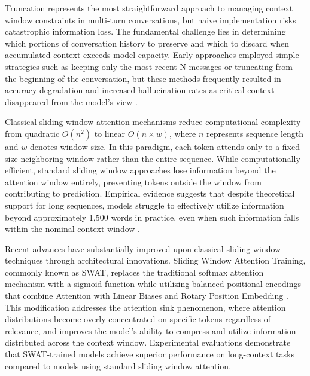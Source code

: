 Truncation represents the most straightforward approach to managing context window constraints in multi-turn conversations, but naive implementation risks catastrophic information loss. The fundamental challenge lies in determining which portions of conversation history to preserve and which to discard when accumulated context exceeds model capacity. Early approaches employed simple strategies such as keeping only the most recent N messages or truncating from the beginning of the conversation, but these methods frequently resulted in accuracy degradation and increased hallucination rates as critical context disappeared from the model's view \citep{greyling2024context}.

Classical sliding window attention mechanisms reduce computational complexity from quadratic $O(n^2)$ to linear $O(n \times w)$, where $n$ represents sequence length and $w$ denotes window size. In this paradigm, each token attends only to a fixed-size neighboring window rather than the entire sequence. While computationally efficient, standard sliding window approaches lose information beyond the attention window entirely, preventing tokens outside the window from contributing to prediction. Empirical evidence suggests that despite theoretical support for long sequences, models struggle to effectively utilize information beyond approximately 1,500 words in practice, even when such information falls within the nominal context window \citep{press2022train}.

Recent advances have substantially improved upon classical sliding window techniques through architectural innovations. Sliding Window Attention Training, commonly known as SWAT, replaces the traditional softmax attention mechanism with a sigmoid function while utilizing balanced positional encodings that combine Attention with Linear Biases and Rotary Position Embedding \citep{chen2025swat}. This modification addresses the attention sink phenomenon, where attention distributions become overly concentrated on specific tokens regardless of relevance, and improves the model's ability to compress and utilize information distributed across the context window. Experimental evaluations demonstrate that SWAT-trained models achieve superior performance on long-context tasks compared to models using standard sliding window attention.

